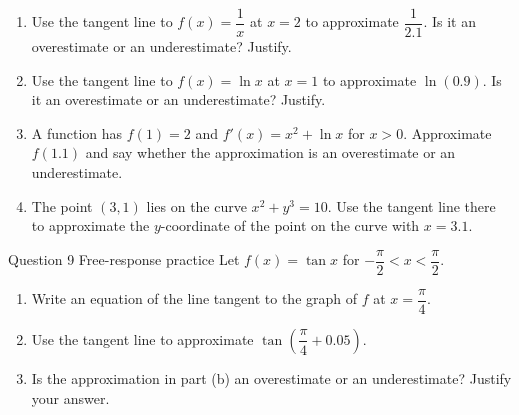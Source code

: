 \documentclass[11pt]{article}
\begin{document}
\begin{enumerate}[leftmargin=*,itemsep=2pt,start=5]
  \item Use the tangent line to $f(x)=\dfrac1x$ at $x=2$ to approximate $\dfrac{1}{2.1}$. Is it an overestimate or an underestimate? Justify.\work{2.8cm}
  \item Use the tangent line to $f(x)=\ln x$ at $x=1$ to approximate $\ln(0.9)$. Is it an overestimate or an underestimate? Justify.\work{2.8cm}
  \item A function has $f(1)=2$ and $f'(x)=x^2+\ln x$ for $x>0$. Approximate $f(1.1)$ and say whether the approximation is an overestimate or an underestimate.\work{2.8cm}
  \item The point $(3,1)$ lies on the curve $x^2+y^3=10$. Use the tangent line there to approximate the $y$-coordinate of the point on the curve with $x=3.1$.\work{2.8cm}
\end{enumerate}

\begin{frbox}{Question 9 \textperiodcentered{} Free-response practice}
Let $f(x)=\tan x$ for $-\dfrac\pi2<x<\dfrac\pi2$.
\begin{enumerate}[label=(\alph*),leftmargin=*,itemsep=2pt]
  \item Write an equation of the line tangent to the graph of $f$ at $x=\dfrac\pi4$.\work{2.6cm}
  \item Use the tangent line to approximate $\tan\!\left(\dfrac\pi4+0.05\right)$.\work{2.6cm}
  \item Is the approximation in part (b) an overestimate or an underestimate? Justify your answer.\work{2.6cm}
\end{enumerate}
\end{frbox}
\end{document}
